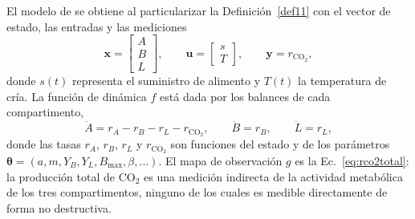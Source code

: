El modelo de \citet{eriksenDynamicModellingFeed2022} se obtiene al particularizar la
Definición~\ref{def11} con el vector de estado, las entradas y las mediciones
\begin{equation}
\mathbf{x} = \begin{bmatrix} A \\ B \\ L \end{bmatrix},
\qquad
\mathbf{u} = \begin{bmatrix} s \\ T \end{bmatrix},
\qquad
\mathbf{y} = r_{\mathrm{CO_2}},
\label{eq:eriksen-sistema}
\end{equation}
donde $s(t)$ representa el suministro de alimento y $T(t)$ la temperatura de
cría. La función de dinámica $f$ está dada por los balances de cada
compartimento,
\begin{equation}
\dot{A} = r_A - r_B - r_L - r_{\mathrm{CO_2}},
\qquad
\dot{B} = r_B,
\qquad
\dot{L} = r_L,
\label{eq:eriksen-edos}
\end{equation}
donde las tasas $r_A$, $r_B$, $r_L$ y $r_{\mathrm{CO_2}}$ son funciones del
estado y de los parámetros
$\boldsymbol{\theta} = (a, m, Y_B, Y_L, B_{\max}, \beta, \dots)$.
El mapa de observación $g$ es la Ec.~\eqref{eq:rco2total}: la producción
total de CO$_2$ es una medición indirecta de la actividad metabólica de los
tres compartimentos, ninguno de los cuales es medible directamente de forma
no destructiva.


